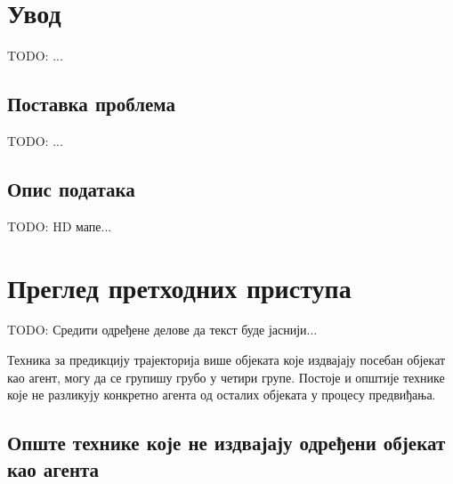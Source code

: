\documentclass[11pt,oneside]{memoir}
\begin{document}
\frontmatter
\naslovna
\komisija
\apstrakt
\tableofcontents*

\mainmatter

\chapter{Увод}

TODO: ...

\section{Поставка проблема}

TODO: ...

\section{Опис података}

TODO: HD мапе...

\chapter{Преглед претходних приступа}
\label{chp:razrada}

TODO: Средити одређене делове да текст буде јаснији...

Техника за предикцију трајекторија више објеката које издвајају посебан објекат као агент, могу да се групишу грубо у четири групе. Постоје
и општије технике које не разликују конкретно агента од осталих објеката у процесу предвиђања.

\section{Опште технике које не издвајају одређени објекат као агента}
\end{document}
